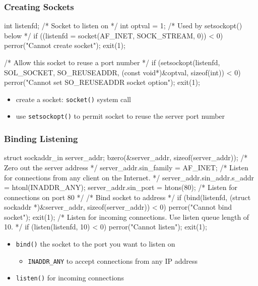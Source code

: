 \documentclass[newPxFont,sthlmFooter,nooffset]{beamer}
\begin{document}
\begin{frame}[t, fragile]
  \frametitle{Creating Sockets}

\begin{codedefnb}
int listenfd;   /* Socket to listen on */
int optval = 1; /* Used by setsockopt() below */
if ((listenfd = socket(AF_INET, SOCK_STREAM, 0)) < 0) {
     perror("Cannot create socket");
     exit(1); 
}

/* Allow this socket to reuse a port number */
if (setsockopt(listenfd, SOL_SOCKET, SO_REUSEADDR,
           (const void*)&optval, sizeof(int)) < 0) {
     perror("Cannot set SO_REUSEADDR socket option");
     exit(1);
}
\end{codedefnb}
\begin{itemize}
\item create a socket: \texttt{socket()} system call
\item use \texttt{setsockopt()} to permit socket to reuse the server port number 
\end{itemize}
\end{frame}


\begin{frame}[t, fragile]
  \frametitle{Binding Listening}
\begin{codedefnb}
struct sockaddr_in server_addr;
bzero(&server_addr, sizeof(server_addr)); /* Zero out the server address */
server_addr.sin_family = AF_INET;
/* Listen for connections from any client on the Internet. */
server_addr.sin_addr.s_addr = htonl(INADDR_ANY);
server_addr.sin_port = htons(80); /* Listen for connections on port 80 */
/* Bind socket to address */
if (bind(listenfd, (struct sockaddr *)&server_addr, 
                          sizeof(server_addr)) < 0) {
     perror("Cannot bind socket");
     exit(1); 
}
/* Listen for incoming connections. Use listen queue length of 10. */ 
if (listen(listenfd, 10) < 0) {
     perror("Cannot listen");
     exit(1); 
}
\end{codedefnb}
\begin{itemize}
\item \texttt{bind()} the socket to the port you want to listen on
  \begin{itemize}
  \item  \texttt{INADDR\_ANY} to accept connections from any IP address 
  \end{itemize}
\item \texttt{listen()} for incoming connections
\end{itemize}
\end{frame}
\end{document}

